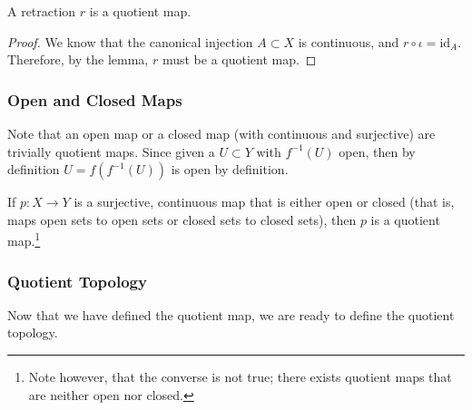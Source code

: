   \begin{theorem}
    A retraction $r$ is a quotient map. 
  \end{theorem}
  \begin{proof}
    We know that the canonical injection $A \subset X$ is continuous, and $r \circ \iota = \mathrm{id}_A$. Therefore, by the lemma, $r$ must be a quotient map. 
  \end{proof}

\subsubsection{Open and Closed Maps}

  Note that an open map or a closed map (with continuous and surjective) are trivially quotient maps. Since given a $U \subset Y$ with $f^{-1} (U)$ open, then by definition $U = f(f^{-1} (U))$ is open by definition. 

  \begin{theorem}
    If $p: X \rightarrow Y$ is a surjective, continuous map that is either open or closed (that is, maps open sets to open sets or closed sets to closed sets), then $p$ is a quotient map.\footnote{Note however, that the converse is not true; there exists quotient maps that are neither open nor closed. }
  \end{theorem} 

  \begin{example}
    
  \end{example}

\subsubsection{Quotient Topology}

  Now that we have defined the quotient map, we are ready to define the quotient topology. 

